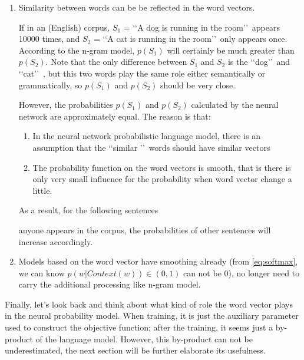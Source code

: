 \begin{enumerate}
\item Similarity between words can be be reflected in the word vectors.

\tab If in an (English) corpus, $S_1$ = \lq\lq A dog is running in the room\rq\rq\ appears 10000 times, and $S_2$ = \lq\lq A cat is running in the room\rq\rq\ only appears once. According to the n-gram model, $p(S_1)$ will certainly be much greater than $p(S_2)$. Note that the only difference between $S_1$ and $S_2$ is the \lq\lq dog\rq\rq\ and \lq\lq cat\rq\rq\ , but this two words play the same role either semantically or grammatically, so $p(S_1)$ and $p(S_2)$ should be very close.

\tab However, the probabilities $p(S_1)$ and $p(S_2)$ calculated by the neural network are approximately equal. The reason is that: 
\begin{enumerate}
\item In the neural network probabilistic language model, there is an assumption that the \lq\lq similar \rq\rq\ words should have similar vectors
\item The probability function on the word vectors is smooth, that is there is only very small influence for the probability when word vector change a little. 
\end{enumerate}
As a result, for the following sentences
anyone appears in the corpus, the probabilities of other sentences will increase accordingly.
\item Models based on the word vector have smoothing already (from \ref{eq:softmax}, we can know $p(w|Context(w))\in(0,1)$ can not be $0$), no longer need to carry the additional processing like n-gram model.
\end{enumerate}

Finally, let's look back and think about what kind of role the word vector plays in the neural probability model. When training, it is just the auxiliary parameter used to construct the objective function; after the training, it seems just a by-product of the language model. However, this by-product can not be underestimated, the next section will be further elaborate its usefulness.
